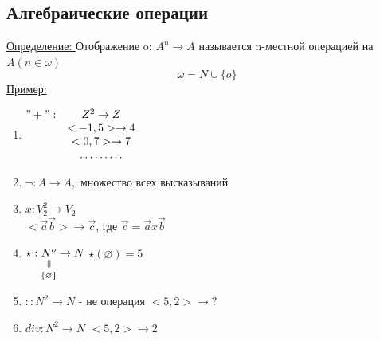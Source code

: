 \documentclass[12pt]{article}
\newcommand{\verteq}{\rotatebox{90}{$\,=$}}
\newcommand{\equalto}[2]{\underset{\scriptstyle\overset{\mkern4mu\verteq}{#2}}{#1}}
\begin{document}
    \subsection{Алгебраические операции}
    \underline{Определение: } Отображение o: $A^n \rightarrow A$ называется n-местной операцией на $A (n \in \omega)$
    \[\omega = N \cup \{o\}\]
    \underline{Пример:}
    \begin{enumerate}
        \item 
        $\begin{matrix}
         "+": & Z^2 \rightarrow Z \\
         & <-1,5> \rightarrow 4\\
         & <0,7> \rightarrow 7\\
         & \dots \dots \dots
        \end{matrix}$
        \item $\neg: A \rightarrow A,$ множество всех высказываний
        \item $x: V_2^2 \rightarrow V_2$\\
              $<\overset{\rightarrow}{a} \overset{\rightarrow}{b}> \rightarrow \overset{\rightarrow}{c}$,
              где $\overset{\rightarrow}{c}=\overset{\rightarrow}{a}x\overset{\rightarrow}{b}$
        \item $\star: \equalto{N^o}{\{\varnothing\}} \rightarrow N$\hspace{20pt} $\star(\varnothing)=5$
        \item $: : N^2 \rightarrow N$ - не операция %
        \hspace{20pt} $<5,2> \rightarrow ?$
        \item $div : N^2 \rightarrow N$ \hspace{20pt} $<5,2> \rightarrow 2$
    \end{enumerate}
    \pagebreak
    
\end{document}

